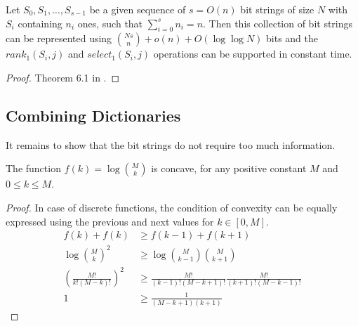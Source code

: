 
\begin{lemma}
	Let $S_0, S_1, \ldots, S_{s-1}$ be a given sequence of $s = O(n)$ bit strings of size $N$ with $S_i$ containing $n_i$ ones, such that $\sum_{i=0}^s n_i = n$.
	Then this collection of bit strings can be represented using ${Ns \choose n} + o(n) + O(\log \log N)$ bits and the $rank_1(S_i, j)$ and $select_1(S_i, j)$ operations can be supported in constant time.
\end{lemma}
\begin{proof}
	Theorem 6.1 in .
\end{proof}

\subsection{Combining Dictionaries}

It remains to show that the bit strings do not require too much information.

\begin{lemma}
	The function $f(k) = \log {M \choose k}$ is concave, for any positive constant $M$ and $0 \le k \le M$.
\end{lemma}
\begin{proof}
	In case of discrete functions, the condition of convexity can be equally expressed using the previous and next values for $k \in [0, M]$.
	\begin{align*}
		f(k) + f(k) &\ge f(k-1) + f(k+1) \\
		\log {M \choose k}^2 &\ge \log {M \choose k - 1} {M \choose k + 1} \\
		\left(\frac{M!}{k! (M-k)!}\right)^2 &\ge \frac{M!}{(k - 1)! (M - k + 1)!} \frac{M!}{(k + 1)! (M - k - 1)!} \\
		1 &\ge \frac{1}{(M-k+1)(k+1)}
	\end{align*}
\end{proof}

